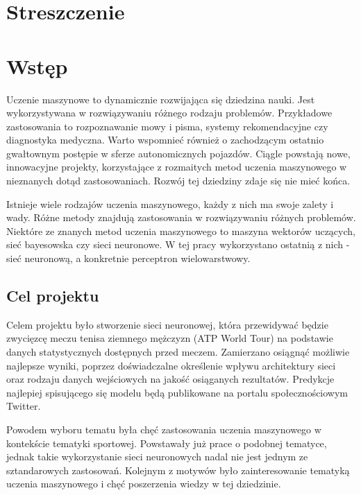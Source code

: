 


\maketitle
\tableofcontents

\chapter{Streszczenie}

\chapter{Wstęp}
Uczenie maszynowe to dynamicznie rozwijająca się dziedzina nauki. Jest wykorzystywana w rozwiązywaniu różnego rodzaju problemów. Przykładowe zastosowania to rozpoznawanie mowy i pisma, systemy rekomendacyjne czy diagnostyka medyczna. Warto wspomnieć również o zachodzącym ostatnio gwałtownym postępie w sferze autonomicznych pojazdów. Ciągle powstają nowe, innowacyjne projekty, korzystające z rozmaitych metod uczenia maszynowego w nieznanych dotąd zastosowaniach. Rozwój tej dziedziny zdaje się nie mieć końca.

Istnieje wiele rodzajów uczenia maszynowego, każdy z nich ma swoje zalety i wady. Różne metody znajdują zastosowania w rozwiązywaniu różnych problemów. Niektóre ze znanych metod uczenia maszynowego to maszyna wektorów uczących, sieć bayesowska czy sieci neuronowe. W tej pracy wykorzystano ostatnią z nich - sieć neuronową, a konkretnie perceptron wielowarstwowy.

\section{Cel projektu}
Celem projektu było stworzenie sieci neuronowej, która przewidywać będzie zwycięzcę meczu tenisa ziemnego mężczyzn (ATP World Tour) na podstawie danych statystycznych dostępnych przed meczem. Zamierzano osiągnąć możliwie najlepsze wyniki, poprzez doświadczalne określenie wpływu architektury sieci oraz rodzaju danych wejściowych na jakość osiąganych rezultatów. Predykcje najlepiej spisującego się modelu będą publikowane na portalu społecznościowym Twitter.

Powodem wyboru tematu była chęć zastosowania uczenia maszynowego w kontekście tematyki sportowej. Powstawały już prace o podobnej tematyce, jednak takie wykorzystanie sieci neuronowych nadal nie jest jednym ze sztandarowych zastosowań. Kolejnym z motywów było zainteresowanie tematyką uczenia maszynowego i chęć poszerzenia wiedzy w tej dziedzinie.


